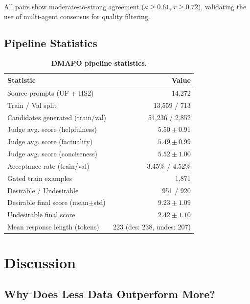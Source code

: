 \documentclass{article}
\newcommand{\ours}{\textsc{DMAPO}}
\begin{document}
All pairs show moderate-to-strong agreement ($\kappa \geq 0.61$, $r \geq 0.72$), validating the use of multi-agent consensus for quality filtering.

\subsection{Pipeline Statistics}

\begin{table}[t]
\centering
\caption{\textbf{\ours{} pipeline statistics.}}
\label{tab:pipeline}
\vspace{0.3em}
\small
\begin{tabular}{l r}
\toprule
\textbf{Statistic} & \textbf{Value} \\
\midrule
Source prompts (UF + HS2)          & 14,272 \\
Train / Val split                  & 13,559 / 713 \\
Candidates generated (train/val)   & 54,236 / 2,852 \\
Judge avg. score (helpfulness)     & $5.50 \pm 0.91$ \\
Judge avg. score (factuality)      & $5.49 \pm 0.99$ \\
Judge avg. score (conciseness)     & $5.52 \pm 1.00$ \\
Acceptance rate (train/val)        & 3.45\% / 4.52\% \\
Gated train examples               & 1,871 \\
Desirable / Undesirable            & 951 / 920 \\
Desirable final score (mean$\pm$std) & $9.23 \pm 1.09$ \\
Undesirable final score            & $2.42 \pm 1.10$ \\
Mean response length (tokens)       & 223 (des: 238, undes: 207) \\
\bottomrule
\end{tabular}
\end{table}


\section{Discussion}
\label{sec:discussion}

\subsection{Why Does Less Data Outperform More?}
\end{document}
